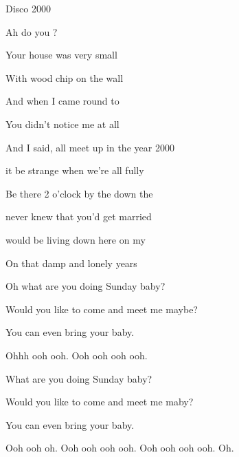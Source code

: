\begin{song}{Disco 2000}{
	
	\chordset[Intro]{ \FMaj \FMajsusFour \BbMajShE \BbMajsusFourShE }	
	\chordset[Verse]{ \FMaj \BbMaj }

	\chordset[Chorus]{ \Cm \BbMaj \Dm \Gm \FMaj }
	
}
	 \begin{songverse*}[Bridge]     
	                  
		Ah do you ?

		Your house was very small

		With wood chip on the wall
                         
		And when I came round to 

		You didn't notice me at all 		
	 \end{songverse*}

	\begin{songchorus}
	
		And I said,  all meet up in the year 2000
                                        
		 it be strange when we're all fully 
                                          
		Be there 2 o'clock by the  down the 

		 never knew that you'd get married 
                             
		 would be living down here on my    

		On that damp and lonely  years  
	\end{songchorus}
	
	\begin{songchorus}
		Oh what are you doing Sunday baby?
		
		Would you like to come and meet me maybe?
		
		You can even bring your baby.
		
		Ohhh ooh ooh. Ooh ooh ooh ooh.
		
		What are you doing Sunday baby?
		
		Would you like to come and meet me maby?
		
		You can even bring your baby.
		
		Ooh ooh oh. Ooh ooh ooh ooh. Ooh ooh ooh ooh. Oh. 
	\end{songchorus}
\end{song}